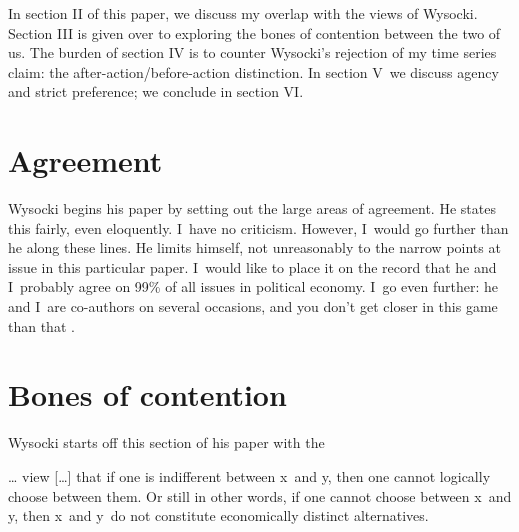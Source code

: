In section II of this paper, we discuss my overlap with the views of Wysocki. Section III is given over to exploring the bones of contention between the two of us. The burden of section IV is to counter Wysocki's rejection of my time series claim: the after-action/before-action distinction. In section V~we discuss agency and strict preference; we conclude in section VI.



\section{Agreement}

Wysocki begins his paper by setting out the large areas of agreement. He states this fairly, even eloquently. I~have no criticism. However, I~would go further than he along these lines. He limits himself, not unreasonably to the narrow points at issue in this particular paper. I~would like to place it on the record that he and I~probably agree on 99\% of all issues in political economy. I~go even further: he and I~are co-authors on several occasions, and you don't get closer in this game than that 
\parencites[][]{block_defense_2018}[][]{wysocki_note_2017}[][]{wysocki_analysis_2018}[][]{wysocki_homogeneity_2019}[][]{wysocki_crovelli_2020}[][]{wysocki_rejoinder_2022}[][]{wysocki_homogeneity_2019}.%




\section{Bones of contention}

Wysocki starts off this section of his paper with the



… view […] that if one is indifferent between x~and y, then one cannot logically choose between them. Or still in other words, if one cannot choose between x~and y, then x~and y~do not constitute economically distinct alternatives.



